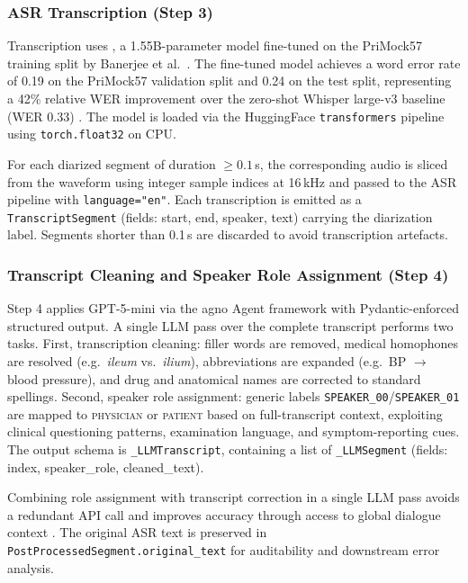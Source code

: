 \subsubsection{ASR Transcription (Step 3)}

Transcription uses , a 1.55B-parameter model fine-tuned on the PriMock57 training split by Banerjee et al.\ \cite{banerjee2024medasr}. The fine-tuned model achieves a word error rate of 0.19 on the PriMock57 validation split and 0.24 on the test split, representing a 42\% relative WER improvement over the zero-shot Whisper large-v3 baseline (WER 0.33) \cite{radford2023whisper}. The model is loaded via the HuggingFace \texttt{transformers} pipeline using \texttt{torch.float32} on CPU.

For each diarized segment of duration $\geq 0.1$\,s, the corresponding audio is sliced from the waveform using integer sample indices at 16\,kHz and passed to the ASR pipeline with \texttt{language="en"}. Each transcription is emitted as a \texttt{TranscriptSegment} (fields: start, end, speaker, text) carrying the diarization label. Segments shorter than 0.1\,s are discarded to avoid transcription artefacts.

\subsubsection{Transcript Cleaning and Speaker Role Assignment (Step 4)}

Step 4 applies GPT-5-mini via the agno Agent framework with Pydantic-enforced structured output. A single LLM pass over the complete transcript performs two tasks. First, transcription cleaning: filler words are removed, medical homophones are resolved (e.g.\ \textit{ileum} vs.\ \textit{ilium}), abbreviations are expanded (e.g.\ BP $\rightarrow$ blood pressure), and drug and anatomical names are corrected to standard spellings. Second, speaker role assignment: generic labels \texttt{SPEAKER\_00}/\texttt{SPEAKER\_01} are mapped to \textsc{physician} or \textsc{patient} based on full-transcript context, exploiting clinical questioning patterns, examination language, and symptom-reporting cues. The output schema is \texttt{\_LLMTranscript}, containing a list of \texttt{\_LLMSegment} (fields: index, speaker\_role, cleaned\_text).

Combining role assignment with transcript correction in a single LLM pass avoids a redundant API call and improves accuracy through access to global dialogue context \cite{efstathiadis2024diarization, adedeji2024sound}. The original ASR text is preserved in \texttt{PostProcessedSegment\discretionary{}{}{}.original\_text} for auditability and downstream error analysis.

